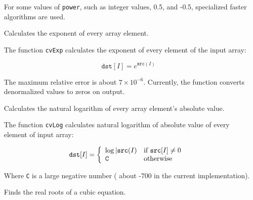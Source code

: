 For some values of \texttt{power}, such as integer values, 0.5, and -0.5, specialized faster algorithms are used.

\label{Exp}

Calculates the exponent of every array element.


\begin{description}
\end{description}


The function \texttt{cvExp} calculates the exponent of every element of the input array:

\[
\texttt{dst} [I] = e^{\texttt{src}(I)}
\]

The maximum relative error is about $7 \times 10^{-6}$. Currently, the function converts denormalized values to zeros on output.

\label{Log}

Calculates the natural logarithm of every array element's absolute value.


\begin{description}
\end{description}

The function \texttt{cvLog} calculates natural logarithm of absolute value of every element of input array:

\[
\texttt{dst} [I] = \left\{ \begin{array}{l l} \log{|\texttt{src}(I)} & \mbox{if $\texttt{src}[I] \ne 0$ }\\ \texttt{C} & \mbox{otherwise}\\ \end{array} \right.
\]

Where \texttt{C} is a large negative number ( about -700 in the current implementation).

\label{SolveCubic}

Finds the real roots of a cubic equation.



